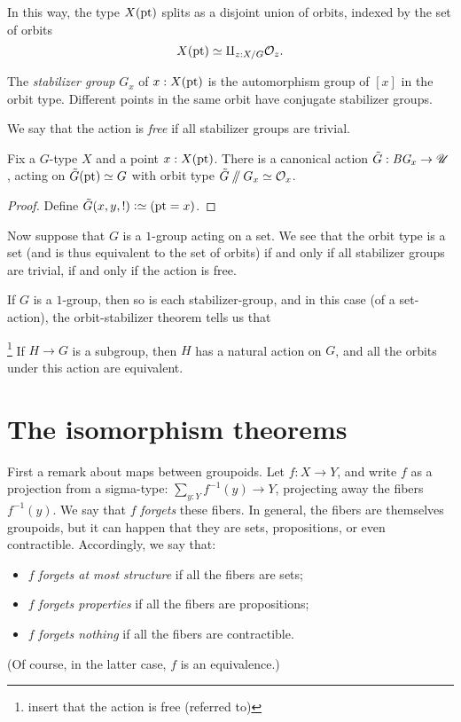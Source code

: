 In this way, the type $X(\mathrm{pt})$ splits as a disjoint union of orbits,
indexed by the set of orbits
\[
  X(\mathrm{pt}) \simeq \amalg_{z : X / G} \mathcal O_z.
\]

The \emph{stabilizer group} $G_x$ of $x : X(\mathrm{pt})$ is the automorphism group of $[x]$ in the orbit type.
Different points in the same orbit have conjugate stabilizer groups.

We say that the action is \emph{free} if all stabilizer groups are trivial.

\begin{theorem}
  \label{thm:orbitstab}
  Fix a $G$-type $X$ and a point $x : X(\mathrm{pt})$.
  There is a canonical action $\tilde G : \mathit{B}\mathit{G}_x \to {\mathscr{U}}$,
  acting on $\tilde G(\mathrm{pt})\simeq G$
  with orbit type $\tilde G\mathbin{/\kern-3pt/} G_x \simeq \mathcal O_x$.
\end{theorem}
\begin{proof}
  Define $\tilde G(x,y,!) \defeq (\pt = x)$.
\end{proof}

Now suppose that $G$ is a $1$-group acting on a set.
We see that the orbit type is a set
(and is thus equivalent to the set of orbits)
if and only if
all stabilizer groups are trivial,
\ie if and only if the action is free.

If $G$ is a $1$-group,
then so is each stabilizer-group,
and in this case (of a set-action),
the orbit-stabilizer theorem
tells us that 

\begin{theorem}\footnote{insert that the action is free (referred to)}
\label{thm:lagrange}
  If $H \to G$ is a subgroup, then $H$ has a natural action on $G$,
  and all the orbits under this action are equivalent.
\end{theorem}


\section{The isomorphism theorems}
\label{sec:noether-theorems}

First a remark about maps between groupoids.
Let $f : X \to Y$, and write $f$ as a projection from a sigma-type:
$\sum_{y:Y} f^{-1}(y) \to Y$,
projecting away the fibers $f^{-1}(y)$.
We say that $f$ \emph{forgets} these fibers.
In general, the fibers are themselves groupoids,
but it can happen that they are sets, propositions, or even contractible.
Accordingly, we say that:
\begin{itemize}
\item $f$ \emph{forgets at most structure} if all the fibers are sets;
\item $f$ \emph{forgets properties} if all the fibers are propositions;
\item $f$ \emph{forgets nothing} if all the fibers are contractible.
\end{itemize}
(Of course, in the latter case, $f$ is an equivalence.)

